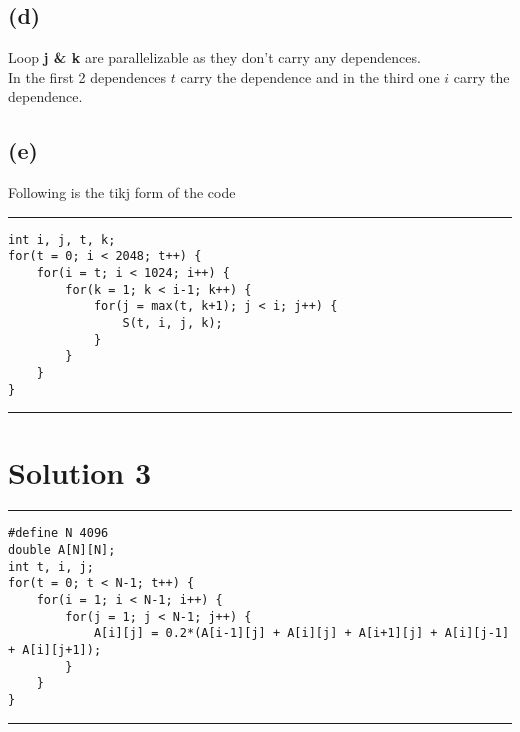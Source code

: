 \documentclass[a4paper]{article}
\begin{document}
\subsection{(d)} Loop {\bf j \& k} are parallelizable as they don't carry any dependences.\\ In the first 2 dependences $t$ carry the dependence and in the third one $i$ carry the dependence.

\subsection{(e)} Following is the tikj form of the code
\newline
\hrule
\begin{lstlisting}
int i, j, t, k;
for(t = 0; i < 2048; t++) {
    for(i = t; i < 1024; i++) {
        for(k = 1; k < i-1; k++) {
            for(j = max(t, k+1); j < i; j++) {
                S(t, i, j, k);
            }
        }
    }
}
\end{lstlisting}
\hrule 

\newpage

\section{Solution 3}

\hrule
\begin{lstlisting}
#define N 4096
double A[N][N];
int t, i, j;
for(t = 0; t < N-1; t++) {
    for(i = 1; i < N-1; i++) {
        for(j = 1; j < N-1; j++) {
            A[i][j] = 0.2*(A[i-1][j] + A[i][j] + A[i+1][j] + A[i][j-1] + A[i][j+1]);
        }
    }
}
\end{lstlisting}
\hrule 
\vspace{0.5cm}
\end{document}
